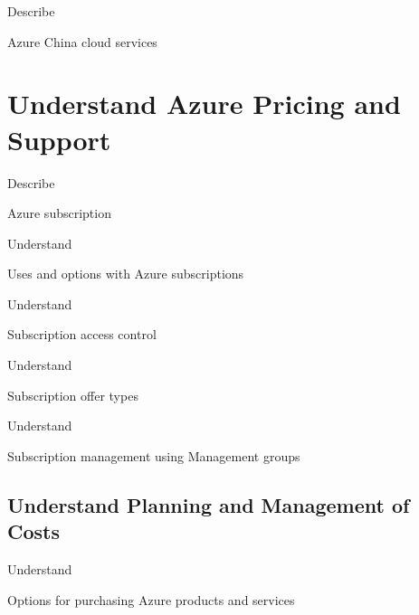 \documentclass{scrartcl}
\newenvironment{flashcard}[2][]{%
    #1
    \vfill
    \centerline{\Large{#2}}
    \vfill
    \newpage
}
{\newpage}
\newcommand{\sectioncard}[1]{
    \vspace*{\stretch{1}}
    \section{#1}
    \vspace*{\stretch{1}}
    \pagebreak
}
\newcommand{\subsectioncard}[1]{
    \vspace*{\stretch{1}}
    \subsection{#1}
    \vspace*{\stretch{1}}
    \pagebreak
}
\begin{document}
    \begin{flashcard}[Describe]{Azure China cloud services}

    \end{flashcard}

    \sectioncard{Understand Azure Pricing and Support}

    \begin{flashcard}[Describe]{Azure subscription}

    \end{flashcard}

    \begin{flashcard}[Understand]{Uses and options with Azure subscriptions}

    \end{flashcard}

    \begin{flashcard}[Understand]{Subscription access control}

    \end{flashcard}

    \begin{flashcard}[Understand]{Subscription offer types}

    \end{flashcard}

    \begin{flashcard}[Understand]{Subscription management using Management groups}

    \end{flashcard}

    \subsectioncard{Understand Planning and Management of Costs}

    \begin{flashcard}[Understand]{Options for purchasing Azure products and services}

    \end{flashcard}
\end{document}

